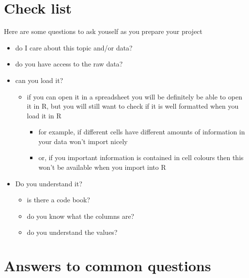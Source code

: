 \documentclass[
  12pt,
  a5paper,
]{book}
\providecommand{\tightlist}{%
  \setlength{\itemsep}{0pt}\setlength{\parskip}{0pt}}
\begin{document}
\hypertarget{check-list}{%
\section{Check list}\label{check-list}}

Here are some questions to ask youself as you prepare your project

\begin{itemize}
\tightlist
\item
  do I care about this topic and/or data?
\item
  do you have access to the raw data?
\item
  can you load it?

  \begin{itemize}
  \tightlist
  \item
    if you can open it in a spreadsheet you will be definitely be able to open it in R, but you will still want to check if it is well formatted when you load it in R

    \begin{itemize}
    \tightlist
    \item
      for example, if different cells have different amounts of information in your data won't import nicely
    \item
      or, if you important information is contained in cell colours then this won't be available when you import into R
    \end{itemize}
  \end{itemize}
\item
  Do you understand it?

  \begin{itemize}
  \tightlist
  \item
    is there a code book?
  \item
    do you know what the columns are?
  \item
    do you understand the values?
  \end{itemize}
\end{itemize}

\hypertarget{answers-to-common-questions}{%
\section{Answers to common questions}\label{answers-to-common-questions}}
\end{document}
